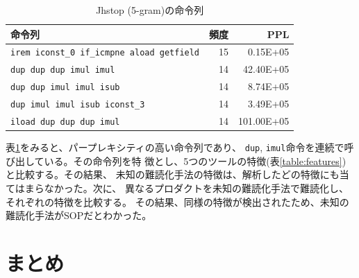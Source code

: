 \documentclass[a4j,fleqn,10pt]{jarticle}
\begin{document}
\begin{table}[t]
  \centering
  \footnotesize{
    \caption{Jhstop (5-gram)の命令列}\label{table:jhstop}
  \begin{tabular}{l|r|r}
    命令列 &
    頻度 & 
    PPL \\ \hline
    \texttt{irem iconst\_0 if\_icmpne aload getfield} & 15 &   0.15E+05 \\
    \texttt{dup dup dup imul imul}                    & 14 &  42.40E+05 \\
    \texttt{dup dup imul imul isub}                   & 14 &   8.74E+05 \\
    \texttt{dup imul imul isub iconst\_3}             & 14 &   3.49E+05 \\
    \texttt{iload dup dup dup imul}                   & 14 & 101.00E+05 \\
    \end{tabular}}
\end{table}

表\ref{table:jhstop}をみると、パープレキシティの高い命令列であり、
\texttt{dup}, \texttt{imul}命令を連続で呼び出している。その命令列を特
徴とし、5つのツールの特徴(表\ref{table:features})と比較する。その結果、
未知の難読化手法の特徴は、解析したどの特徴にも当てはまらなかった。次に、
異なるプロダクトを未知の難読化手法で難読化し、それぞれの特徴を比較する。
その結果、同様の特徴が検出されたため、未知の難読化手法がSOPだとわかった。
 
\section{まとめ}
\end{document}
